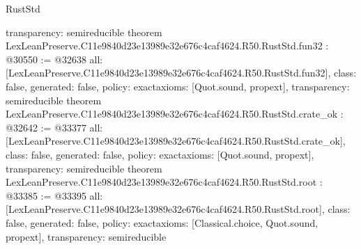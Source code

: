 \begin{lexlean}{RustStd}
\begin{coremodule}
{  transparency: semireducible
}
theorem LexLeanPreserve.C11e9840d23e13989e32e676c4caf4624.R50.RustStd.fun32 : @30550 := @32638 {
  all: [LexLeanPreserve.C11e9840d23e13989e32e676c4caf4624.R50.RustStd.fun32],
  class: false,
  generated: false,
  policy: exact{axioms: [Quot.sound, propext]},
  transparency: semireducible
}
theorem LexLeanPreserve.C11e9840d23e13989e32e676c4caf4624.R50.RustStd.crate_ok : @32642 := @33377 {
  all: [LexLeanPreserve.C11e9840d23e13989e32e676c4caf4624.R50.RustStd.crate_ok],
  class: false,
  generated: false,
  policy: exact{axioms: [Quot.sound, propext]},
  transparency: semireducible
}
theorem LexLeanPreserve.C11e9840d23e13989e32e676c4caf4624.R50.RustStd.root : @33385 := @33395 {
  all: [LexLeanPreserve.C11e9840d23e13989e32e676c4caf4624.R50.RustStd.root],
  class: false,
  generated: false,
  policy: exact{axioms: [Classical.choice, Quot.sound, propext]},
  transparency: semireducible
}


\end{coremodule}
\end{lexlean}
